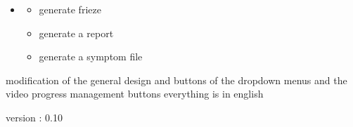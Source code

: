 \documentclass[letterpaper,10pt,english]{sphinxmanual}
\begin{document}
\begin{itemize}
\begin{description}
\begin{itemize}
\item {} 
\sphinxAtStartPar
retrieve start and end times

\item {} 
\sphinxAtStartPar
display symptoms on the right

\item {} 
\sphinxAtStartPar
scrollable symptoms

\item {} 
\sphinxAtStartPar
pop\sphinxhyphen{}up to modify symptoms

\end{itemize}

\end{description}

\item {} \begin{description}
\begin{itemize}
\item {} 
\sphinxAtStartPar
generate frieze

\item {} 
\sphinxAtStartPar
generate a report

\item {} 
\sphinxAtStartPar
generate a symptom file

\end{itemize}

\end{description}

\end{itemize}

\sphinxAtStartPar
modification of the general design and buttons of the drop\sphinxhyphen{}down menus and the video progress management buttons
everything is in english

\sphinxAtStartPar
version : 0.10
\end{document}
